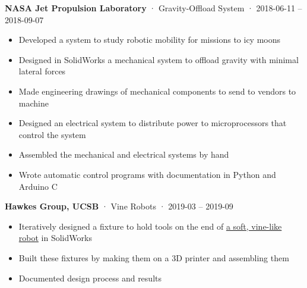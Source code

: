 \documentclass[12pt, oneside]{article}
\newcommand{\jobtitle}[3] {
	{\bf #1} · {#2} · {#3} \vspace{-7pt} \\
}
\begin{document}
\begin{flushleft}
\jobtitle{NASA Jet Propulsion Laboratory}{Gravity-Offload System}{2018-06-11 – 2018-09-07}
\begin{itemize}
	\item Developed a system to study robotic mobility for missions to icy moons \\
	\item Designed in SolidWorks a mechanical system to offload gravity with minimal lateral forces \\
	\item Made engineering drawings of mechanical components to send to vendors to machine \\
	\item Designed an electrical system to distribute power to microprocessors that control the system \\
	\item Assembled the mechanical and electrical systems by hand \\
	\item Wrote automatic control programs with documentation in Python and Arduino C
\end{itemize}
%

\jobtitle{Hawkes Group, UCSB}{Vine Robots}{2019-03 – 2019-09}
\begin{itemize}
	\item Iteratively designed a fixture to hold tools on the end of \href{https://portfolium.com/entry/vine-robot-tool-mount}{a soft, vine-like robot} in SolidWorks
	\item Built these fixtures by making them on a 3D printer and assembling them 
	\item Documented design process and results
\end{itemize}


\end{flushleft}
\end{document}
